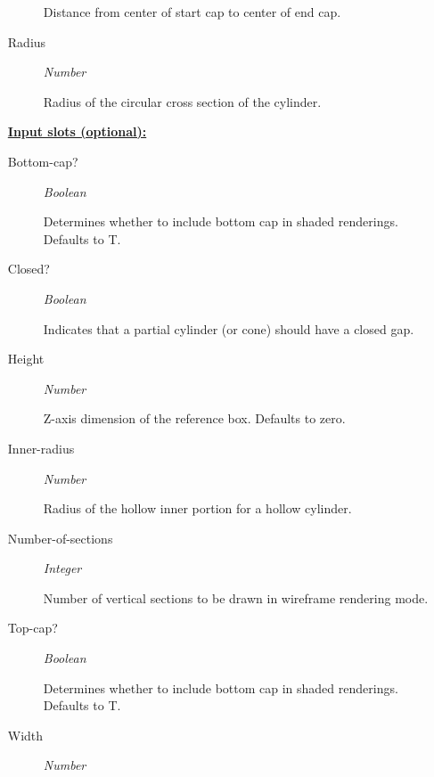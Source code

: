 \documentclass [11pt]{book}
\begin{document}
\begin{itemize}
\begin{description}
 Distance from center of start cap to center of end cap.




\item [Radius]
\emph{Number}

 Radius of the circular cross section of the cylinder.




\end{description}






\textbf{
\underline{Input slots (optional):}}

\begin{description}

\item [Bottom-cap?]
\emph{Boolean}

 Determines whether to include bottom cap in shaded renderings. Defaults to T.




\item [Closed?]
\emph{Boolean}

 Indicates that a partial cylinder (or cone) should have a closed gap.




\item [Height]
\emph{Number}

 Z-axis dimension of the reference box. Defaults to zero.




\item [Inner-radius]
\emph{Number}

 Radius of the hollow inner portion for a hollow cylinder.




\item [Number-of-sections]
\emph{Integer}

 Number of vertical sections to be drawn in wireframe rendering mode.




\item [Top-cap?]
\emph{Boolean}

 Determines whether to include bottom cap in shaded renderings. Defaults to T.




\item [Width]
\emph{Number}


\end{description}
\end{itemize}
\end{document}
